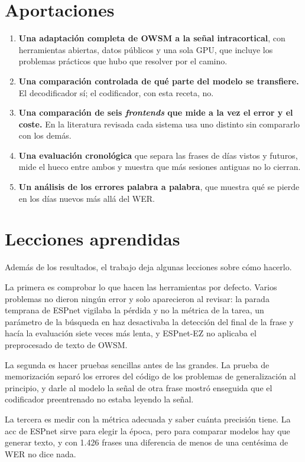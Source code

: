 \section{Aportaciones}

\begin{enumerate}[leftmargin=*, itemsep=0.35em]
  \item \textbf{Una adaptación completa de OWSM a la señal intracortical}, con herramientas abiertas, datos públicos y una sola GPU, que incluye los problemas prácticos que hubo que resolver por el camino.
  \item \textbf{Una comparación controlada de qué parte del modelo se transfiere.} El decodificador sí; el codificador, con esta receta, no.
  \item \textbf{Una comparación de seis \textit{frontends} que mide a la vez el error y el coste.} En la literatura revisada cada sistema usa uno distinto sin compararlo con los demás.
  \item \textbf{Una evaluación cronológica} que separa las frases de días vistos y futuros, mide el hueco entre ambos y muestra que más sesiones antiguas no lo cierran.
  \item \textbf{Un análisis de los errores palabra a palabra}, que muestra qué se pierde en los días nuevos más allá del WER.
\end{enumerate}

\section{Lecciones aprendidas}

Además de los resultados, el trabajo deja algunas lecciones sobre cómo hacerlo.

La primera es comprobar lo que hacen las herramientas por defecto. Varios problemas no dieron ningún error y solo aparecieron al revisar: la parada temprana de ESPnet vigilaba la pérdida y no la métrica de la tarea, un parámetro de la búsqueda en haz desactivaba la detección del final de la frase y hacía la evaluación siete veces más lenta, y ESPnet-EZ no aplicaba el preprocesado de texto de OWSM.

La segunda es hacer pruebas sencillas antes de las grandes. La prueba de memorización separó los errores del código de los problemas de generalización al principio, y darle al modelo la señal de otra frase mostró enseguida que el codificador preentrenado no estaba leyendo la señal.

La tercera es medir con la métrica adecuada y saber cuánta precisión tiene. La acc de ESPnet sirve para elegir la época, pero para comparar modelos hay que generar texto, y con 1.426 frases una diferencia de menos de una centésima de WER no dice nada.

